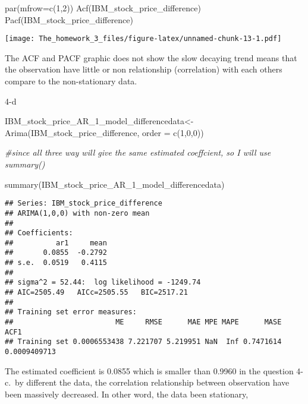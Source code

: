 \documentclass[
]{article}
\newenvironment{Shaded}{\begin{snugshade}}{\end{snugshade}}
\newcommand{\AttributeTok}[1]{\textcolor[rgb]{0.77,0.63,0.00}{#1}}
\newcommand{\CommentTok}[1]{\textcolor[rgb]{0.56,0.35,0.01}{\textit{#1}}}
\newcommand{\DecValTok}[1]{\textcolor[rgb]{0.00,0.00,0.81}{#1}}
\newcommand{\FunctionTok}[1]{\textcolor[rgb]{0.00,0.00,0.00}{#1}}
\newcommand{\NormalTok}[1]{#1}
\newcommand{\OtherTok}[1]{\textcolor[rgb]{0.56,0.35,0.01}{#1}}
\begin{document}
\begin{Shaded}
\begin{Highlighting}[]
\FunctionTok{par}\NormalTok{(}\AttributeTok{mfrow=}\FunctionTok{c}\NormalTok{(}\DecValTok{1}\NormalTok{,}\DecValTok{2}\NormalTok{))}
\FunctionTok{Acf}\NormalTok{(IBM\_stock\_price\_difference)}
\FunctionTok{Pacf}\NormalTok{(IBM\_stock\_price\_difference)}
\end{Highlighting}
\end{Shaded}

\texttt{[image: The\_homework\_3\_files/figure-latex/unnamed-chunk-13-1.pdf]}

The ACF and PACF graphic does not show the slow decaying trend means
that the observation have little or non relationship (correlation) with
each others compare to the non-stationary data.

4-d

\begin{Shaded}
\begin{Highlighting}[]
\NormalTok{IBM\_stock\_price\_AR\_1\_model\_differencedata}\OtherTok{\textless{}{-}} \FunctionTok{Arima}\NormalTok{(IBM\_stock\_price\_difference, }\AttributeTok{order =} \FunctionTok{c}\NormalTok{(}\DecValTok{1}\NormalTok{,}\DecValTok{0}\NormalTok{,}\DecValTok{0}\NormalTok{))}

\CommentTok{\#since all three way will give the same estimated coeffcient, so I will use summary()}

\FunctionTok{summary}\NormalTok{(IBM\_stock\_price\_AR\_1\_model\_differencedata)}
\end{Highlighting}
\end{Shaded}

\begin{verbatim}
## Series: IBM_stock_price_difference 
## ARIMA(1,0,0) with non-zero mean 
## 
## Coefficients:
##          ar1     mean
##       0.0855  -0.2792
## s.e.  0.0519   0.4115
## 
## sigma^2 = 52.44:  log likelihood = -1249.74
## AIC=2505.49   AICc=2505.55   BIC=2517.21
## 
## Training set error measures:
##                        ME     RMSE      MAE MPE MAPE      MASE         ACF1
## Training set 0.0006553438 7.221707 5.219951 NaN  Inf 0.7471614 0.0009409713
\end{verbatim}

The estimated coefficient is 0.0855 which is smaller than 0.9960 in the
question 4-c.~by different the data, the correlation relationship
between observation have been massively decreased. In other word, the
data been stationary,
\end{document}
